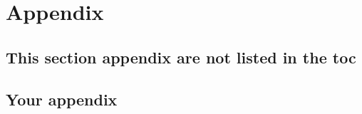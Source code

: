 \documentclass[
	12pt %
	,a4paper %
	,headings=normal %
	,toc=graduated %
]{scrreprt} %
\begin{document}
\blinddocument

\blindmathpaper


\appendix
\chapter{Appendix}
\setcounter{page}{1}

\section*{This section appendix are not listed in the toc}
\section{Your appendix}
\end{document}
